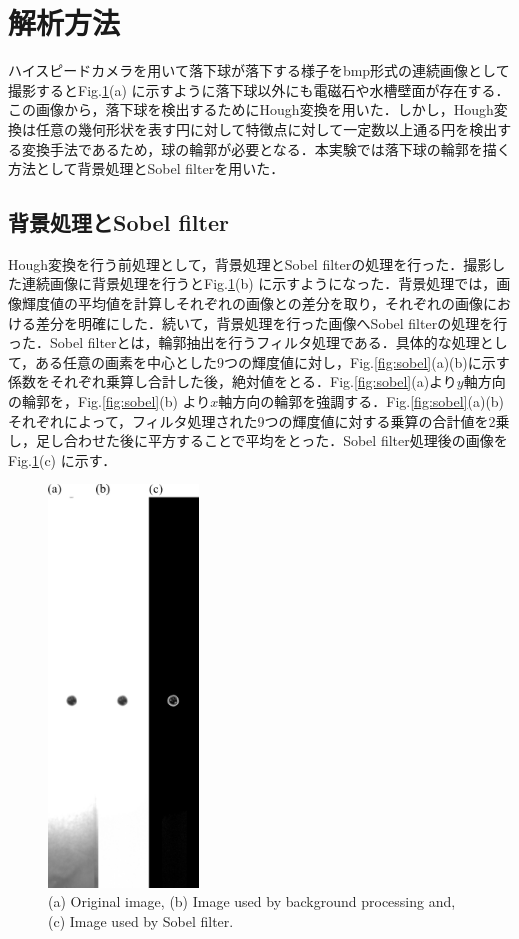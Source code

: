 \section{解析方法}
ハイスピードカメラを用いて落下球が落下する様子をbmp形式の連続画像として撮影するとFig.\ref{fig:expPhoto}(a) に示すように落下球以外にも電磁石や水槽壁面が存在する．この画像から，落下球を検出するためにHough変換を用いた．しかし，Hough変換は任意の幾何形状を表す円に対して特徴点に対して一定数以上通る円を検出する変換手法であるため，球の輪郭が必要となる．本実験では落下球の輪郭を描く方法として背景処理とSobel filterを用いた．
\subsection{背景処理とSobel filter}
Hough変換を行う前処理として，背景処理とSobel filterの処理を行った．撮影した連続画像に背景処理を行うとFig.\ref{fig:expPhoto}(b) に示すようになった．背景処理では，画像輝度値の平均値を計算しそれぞれの画像との差分を取り，それぞれの画像における差分を明確にした．続いて，背景処理を行った画像へSobel filterの処理を行った．Sobel filterとは，輪郭抽出を行うフィルタ処理である．具体的な処理として，ある任意の画素を中心とした9つの輝度値に対し，Fig.\ref{fig:sobel}(a)(b)に示す係数をそれぞれ乗算し合計した後，絶対値をとる．Fig.\ref{fig:sobel}(a)より$y$軸方向の輪郭を，Fig.\ref{fig:sobel}(b) より$x$軸方向の輪郭を強調する．Fig.\ref{fig:sobel}(a)(b)それぞれによって，フィルタ処理された9つの輝度値に対する乗算の合計値を2乗し，足し合わせた後に平方することで平均をとった．Sobel filter処理後の画像をFig.\ref{fig:expPhoto}(c) に示す．

\begin{figure}[h]
    \centering
    \includegraphics[width=4.0cm,clip]{3-Analysis/exp-img.png}
    \caption{(a) Original image, (b) Image used by background processing and, (c) Image used by Sobel filter.}
    \label{fig:expPhoto}
\end{figure}

